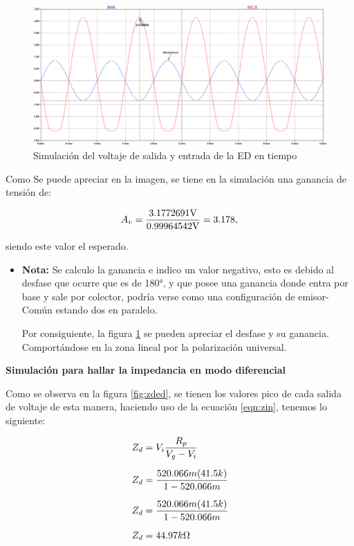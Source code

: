 \begin{enumerate}
        \begin{figure}[H]
          \centering
          \includegraphics[width=\textwidth]{Imagenes/sim_voed.png}
          \caption{Simulación del voltaje de salida y entrada de la ED en tiempo}
          \label{fig:voed}
        \end{figure}

        Como Se puede apreciar en la imagen, se tiene en la simulación una ganancia de tensión de:

        $$A_v=\dfrac{3.1772691\volt}{0.99964542\volt}= 3.178, $$

        siendo este valor el esperado.

        \begin{itemize}
          \item \textbf{Nota: } Se calculo la ganancia e indico un valor negativo, esto es debido al desfase que ocurre que es de 180°, y que posee una ganancia donde entra por base y sale por colector, podría verse como una configuración de emisor-Común estando dos en paralelo.

                Por consiguiente, la figura \ref{fig:voed} se pueden apreciar el desfase y su ganancia. Comportándose en la zona lineal por la polarización universal.
        \end{itemize}

        \textbf{Simulación para hallar la impedancia en modo diferencial}

        Como se observa en la figura \ref{fig:zded}, se tienen los valores pico de cada salida de voltaje de esta manera, haciendo uso de la ecuación \ref{eqn:zin}, tenemos lo siguiente:

        \begin{align*}
          Z_{d} & = V_i \dfrac{R_p}{V_g-V_i}           \\[0.2cm]
          Z_{d} & =\dfrac{520.066m(41.5k)}{1-520.066m} \\[0.2cm]
          Z_{d} & =\dfrac{520.066m(41.5k)}{1-520.066m} \\[0.2cm]
          Z_{d} & =44.97k\ohm                          \\[0.2cm]
        \end{align*}


\end{enumerate}
